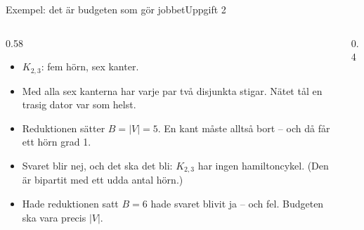 \documentclass[aspectratio=169,10pt]{beamer}
\begin{document}
\begin{frame}{Exempel: det är budgeten som gör jobbet}{Uppgift 2}
  \begin{columns}[T]
    \begin{column}{0.58\textwidth}
      \begin{itemize}
        \item<1-> $K_{2,3}$: fem hörn, sex kanter.
        \item<2-> Med alla sex kanterna har varje par två disjunkta stigar. Nätet tål en trasig dator var som helst.
        \item<3-> Reduktionen sätter $B=|V|=5$. En kant måste alltså bort -- och då får ett hörn grad 1.
        \item<4-> Svaret blir nej, och det ska det bli: $K_{2,3}$ har ingen hamiltoncykel. (Den är bipartit med ett udda antal hörn.)
        \item<5-> Hade reduktionen satt $B=6$ hade svaret blivit ja -- och fel. Budgeten ska vara precis $|V|$.
      \end{itemize}
    \end{column}
    \begin{column}{0.4\textwidth}
      \centering
    \end{column}
  \end{columns}
\end{frame}
\end{document}

